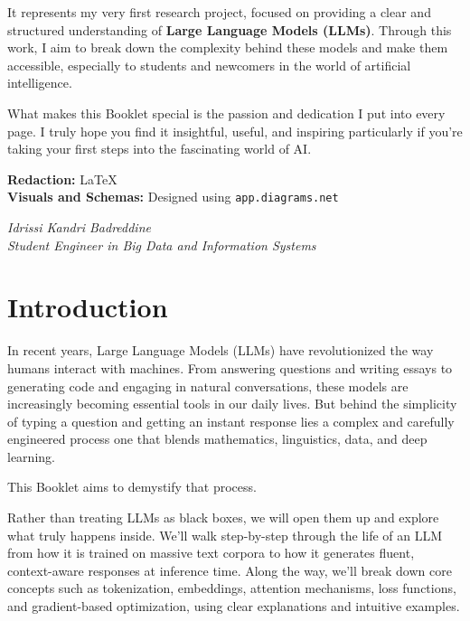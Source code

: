 \documentclass[12pt]{article}
\begin{document}
\vspace{0.5cm}

\noindent
It represents my very first research project, focused on providing a clear and structured understanding of \textbf{Large Language Models (LLMs)}. Through this work, I aim to break down the complexity behind these models and make them accessible, especially to students and newcomers in the world of artificial intelligence.

\vspace{0.5cm}

\noindent
What makes this Booklet special is the passion and dedication I put into every page. I truly hope you find it insightful, useful, and inspiring particularly if you're taking your first steps into the fascinating world of AI.

\vspace{1cm}

\noindent
\textbf{Redaction:} \LaTeX \\
\textbf{Visuals and Schemas:} Designed using \texttt{app.diagrams.net}

\vfill

\begin{flushright}
    \textit{Idrissi Kandri Badreddine} \\
    \textit{Student Engineer in Big Data and Information Systems}
\end{flushright}

\newpage
\vspace*{3cm}
\hypersetup{hidelinks}
\tableofcontents
\newpage
\vspace*{4cm}
\section{Introduction}

In recent years, Large Language Models (LLMs) have revolutionized the way humans interact with machines. From answering questions and writing essays to generating code and engaging in natural conversations, these models are increasingly becoming essential tools in our daily lives. But behind the simplicity of typing a question and getting an instant response lies a complex and carefully engineered process one that blends mathematics, linguistics, data, and deep learning.

This Booklet aims to demystify that process.

Rather than treating LLMs as black boxes, we will open them up and explore what truly happens inside. We'll walk step-by-step through the life of an LLM from how it is trained on massive text corpora to how it generates fluent, context-aware responses at inference time. Along the way, we’ll break down core concepts such as tokenization, embeddings, attention mechanisms, loss functions, and gradient-based optimization, using clear explanations and intuitive examples.
\end{document}
